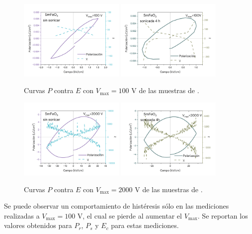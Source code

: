\documentclass[../main.tex]{subfiles}
\begin{document}
\begin{figure}[H]
    \centering
    \includegraphics[width=0.45\textwidth]{fig/PESmFeO3100V.png}
    \quad
    \includegraphics[width=0.45\textwidth]{fig/PESmFeO3-S100V.png}
    \caption{Curvas $P$ contra $E$ con $V_\text{max}=100$ V de las muestras de \sama{}.}
    \label{fig:sm100v}
\end{figure}
\begin{figure}[H]
    \centering
    \includegraphics[width=0.45\textwidth]{fig/PESmFeO32000V.png}
    \quad
    \includegraphics[width=0.45\textwidth]{fig/PESmFeO3-S2000V.png}
    \caption{Curvas $P$ contra $E$ con $V_\text{max}=2000$ V de las muestras de \sama{}.}
    \label{fig:sm2000v}
\end{figure}
Se puede observar un comportamiento de histéresis sólo en las mediciones realizadas a $V_\text{max}=100$ V, el cual se pierde al aumentar el $V_\text{max}$. Se reportan los valores obtenidos para $P_r$, $P_s$ y $E_c$ para estas mediciones.
\end{document}
